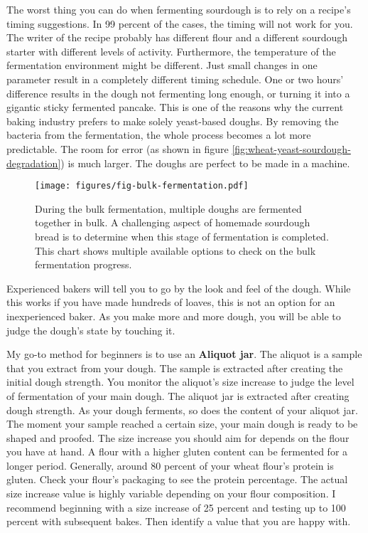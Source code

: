 The worst thing you can do when fermenting sourdough
is to rely on a recipe's timing suggestions. In 99 percent
of the cases, the timing will not work for you. The writer
of the recipe probably has different flour and a different
sourdough starter with different levels of activity. Furthermore,
the temperature of the fermentation environment might be
different. Just small changes in one parameter result
in a completely different timing schedule. One or two hours'
difference results in the dough not fermenting long enough, or
turning it into a gigantic sticky fermented pancake. This
is one of the reasons why the current baking industry prefers
to make solely yeast-based doughs. By removing the bacteria
from the fermentation, the whole process becomes a lot more
predictable. The room for error (as shown in figure \ref{fig:wheat-yeast-sourdough-degradation})
is much larger. The doughs are perfect to be made in a
machine.

\begin{figure}[!htb]
  \texttt{[image: figures/fig-bulk-fermentation.pdf]}
  \caption{During the bulk fermentation, multiple doughs are fermented together in bulk.
  A challenging aspect of homemade sourdough bread is to determine when this stage of
  fermentation is completed. This chart shows multiple available options to check on the bulk
  fermentation progress.}
  \label{fig:bulk-fermentation}
\end{figure}

Experienced bakers will tell you to go by the look and feel of
the dough. While this works if you have made hundreds of loaves,
this is not an option for an inexperienced baker. As
you make more and more dough, you will be able to judge
the dough's state by touching it.

My go-to method for beginners is to use an \textbf{Aliquot jar}.
The aliquot is a sample that you extract from your dough. The
sample is extracted after creating the initial dough strength.
You monitor the aliquot's size increase to judge the
level of fermentation of your main dough. The aliquot
jar is extracted after creating dough strength. As your
dough ferments, so does the content of your aliquot jar. The moment your
sample reached a certain size, your main dough is ready
to be shaped and proofed. The size increase you should
aim for depends on the flour you have at hand. A flour
with a higher gluten content can be fermented for a
longer period. Generally, around 80 percent
of your wheat flour's protein is gluten. Check your flour's
packaging to see the protein percentage. The actual size increase
value is highly variable depending on your flour composition.
I recommend beginning with a size increase of 25 percent and testing
up to 100 percent with subsequent bakes. Then identify a value
that you are happy with.

